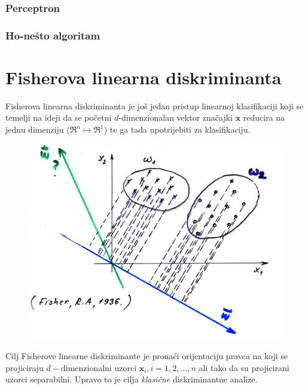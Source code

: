 \documentclass{book}
\begin{document}
  
 
\subsection{Perceptron}
\subsection{Ho-nešto algoritam}

\chapter{Fisherova linearna diskriminanta}

Fisherova
linearna diskriminanta je još  jedan pristup linearnoj klasifikaciji koji se
temelji na ideji da se početni  $d$-dimenzionalan vektor značajki $\mathbf{x}$
reducira na jednu dimenziju ($\Re^n \mapsto \Re^1 $) te ga  tada upotrijebiti za
klasifikaciju. \\

\begin{figure}[H]
\begin{center}
\includegraphics[scale=0.5]{./pics/fisher_beg}
\end{center}
\end{figure}

Cilj Fisherove linearne diskriminante je pronaći orijentaciju pravca na koji se
projiciraju $d-$dimenzionalni uzorci $\mathbf{x}_i, i = 1,2,\ldots,n$ ali tako
da su projicirani uzorci separabilni. Upravo to je cilja \textit{klasične}
diskriminantne analize. \\
\end{document}
